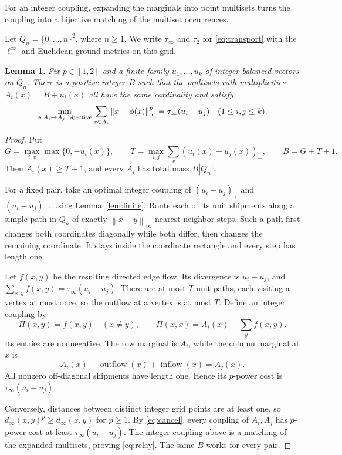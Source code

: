 \documentclass[11pt]{article}
\newtheorem{lemma}[theorem]{Lemma}
\theoremstyle{remark}
\newcommand{\norm}[1]{\left\lVert#1\right\rVert}
\begin{document}
For an integer coupling, expanding the marginals into point multisets turns the coupling into a bijective matching of the multiset occurrences.

Let \(Q_n=\{0,\ldots,n\}^2\), where \(n\ge1\). We write \(\tau_\infty\) and \(\tau_2\) for \eqref{eq:transport} with the \(\ell^\infty\) and Euclidean ground metrics on this grid.

\begin{lemma}\label{lem:relay}
Fix \(p\in[1,2]\) and a finite family \(u_1,\ldots,u_k\) of integer balanced vectors on \(Q_n\). There is a positive integer \(B\) such that the multisets with multiplicities \(A_i(x)=B+u_i(x)\) all have the same cardinality and satisfy
\begin{equation}
 \min_{\phi:A_i\to A_j\ {\rm bijective}}
       \sum_{x\in A_i}\norm{x-\phi(x)}_\infty^p
       =\tau_\infty(u_i-u_j)
 \quad(1\le i,j\le k).
 \label{eq:relay}
\end{equation}
\end{lemma}

\begin{proof}
Put
\[
 G=\max_{i,x}\max\{0,-u_i(x)\},\qquad
 T=\max_{i,j}\sum_x(u_i(x)-u_j(x))_+,\qquad B=G+T+1.
\]
Then \(A_i(x)\ge T+1\), and every \(A_i\) has total mass \(B|Q_n|\).

For a fixed pair, take an optimal integer coupling of \((u_i-u_j)_+\) and \((u_i-u_j)_-\), using Lemma~\ref{lem:finite}. Route each of its unit shipments along a simple path in \(Q_n\) of exactly \(\norm{x-y}_\infty\) nearest-neighbor steps. Such a path first changes both coordinates diagonally while both differ, then changes the remaining coordinate. It stays inside the coordinate rectangle and every step has length one.

Let \(f(x,y)\) be the resulting directed edge flow. Its divergence is \(u_i-u_j\), and
\(\sum_{x,y}f(x,y)=\tau_\infty(u_i-u_j)\).
There are at most \(T\) unit paths, each visiting a vertex at most once, so the outflow at a vertex is at most \(T\). Define an integer coupling by
\[
 \Pi(x,y)=f(x,y)\quad(x\ne y),\qquad
 \Pi(x,x)=A_i(x)-\sum_y f(x,y).
\]
Its entries are nonnegative. The row marginal is \(A_i\), while the column marginal at \(x\) is
\[
 A_i(x)-\operatorname{outflow}(x)+\operatorname{inflow}(x)=A_j(x).
\]
All nonzero off-diagonal shipments have length one. Hence its \(p\)-power cost is \(\tau_\infty(u_i-u_j)\).

Conversely, distances between distinct integer grid points are at least one, so \(d_\infty(x,y)^p\ge d_\infty(x,y)\) for \(p\ge1\). By \eqref{eq:cancel}, every coupling of \(A_i,A_j\) has \(p\)-power cost at least \(\tau_\infty(u_i-u_j)\). The integer coupling above is a matching of the expanded multisets, proving \eqref{eq:relay}. The same \(B\) works for every pair.
\end{proof}
\end{document}
